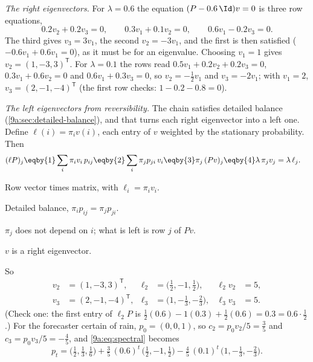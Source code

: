 \emph{The right eigenvectors.} For $\lambda=0.6$ the equation $(P-0.6\,\Id)v=0$ is three
row equations,
\begin{equation*}
  0.2v_2+0.2v_3=0,\qquad 0.3v_1+0.1v_2=0,\qquad 0.6v_1-0.2v_3=0 .
\end{equation*}
The third gives $v_3=3v_1$, the second $v_2=-3v_1$, and the first is then satisfied
($-0.6v_1+0.6v_1=0$), as it must be for an eigenvalue. Choosing $v_1=1$ gives
$v_2=(1,-3,3)^{\mathsf T}$. For $\lambda=0.1$ the rows read $0.5v_1+0.2v_2+0.2v_3=0$,
$0.3v_1+0.6v_2=0$ and $0.6v_1+0.3v_3=0$, so $v_2=-\tfrac12v_1$ and $v_3=-2v_1$; with $v_1=2$,
$v_3=(2,-1,-4)^{\mathsf T}$ (the first row checks: $1-0.2-0.8=0$).

\emph{The left eigenvectors from reversibility.} The chain satisfies detailed balance
(\cref{9a:sec:detailed-balance}), and that turns each right eigenvector into a left one. Define
$\ell(i)=\pi_iv(i)$, each entry of $v$ weighted by the stationary probability. Then
\begin{align*}
  (\ell P)_j
  &\eqby{1}\sum_i\pi_iv_i\,p_{ij}
   \eqby{2}\sum_i\pi_jp_{ji}\,v_i
   \eqby{3}\pi_j\,(Pv)_j
   \eqby{4}\lambda\,\pi_jv_j=\lambda\,\ell_j .
\end{align*}
\begin{explain}
  \item Row vector times matrix, with $\ell_i=\pi_iv_i$.
  \item Detailed balance, $\pi_ip_{ij}=\pi_jp_{ji}$.
  \item $\pi_j$ does not depend on $i$; what is left is row $j$ of $Pv$.
  \item $v$ is a right eigenvector.
\end{explain}
So
\begin{align*}
  v_2&=(1,-3,3)^{\mathsf T}, & \ell_2&=\bigl(\tfrac12,-1,\tfrac12\bigr), & \ell_2v_2&=5,\\
  v_3&=(2,-1,-4)^{\mathsf T}, & \ell_3&=\bigl(1,-\tfrac13,-\tfrac23\bigr), & \ell_3v_3&=5.
\end{align*}
(Check one: the first entry of $\ell_2P$ is $\tfrac12(0.6)-1(0.3)+\tfrac12(0.6)=0.3=0.6\cdot\tfrac12$.)
For the forecaster certain of rain, $p_0=(0,0,1)$, so $c_2=p_0v_2/5=\tfrac35$ and
$c_3=p_0v_3/5=-\tfrac45$, and \eqref{9a:eq:spectral} becomes
\begin{equation}
  p_t=\bigl(\tfrac12,\tfrac13,\tfrac16\bigr)
      +\tfrac35\,(0.6)^t\,\bigl(\tfrac12,-1,\tfrac12\bigr)
      -\tfrac45\,(0.1)^t\,\bigl(1,-\tfrac13,-\tfrac23\bigr).
  \label{9a:eq:weather-exact}
\end{equation}
